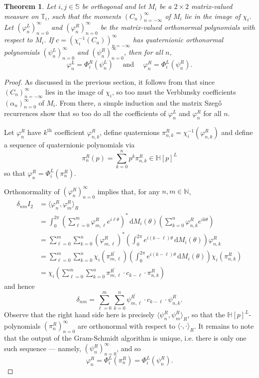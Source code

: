 \documentclass[11pt,reqno]{amsart}
\def\a{\alpha}
\def\x{\chi}
\def\p{\varphi}
\def\q{\psi}
\def\d{\delta}
\def\th{\theta}
\def\P{\Phi}
\def\rmd{\mathrm{d}}
\def\NN{\mathbb{N}}
\def\SS{\mathbb{S}}
\def\TT{\mathbb{T}}
\def\HH{\mathbb{H}}
\newtheorem{theorem}{Theorem}[section]
\theoremstyle{definition}
\numberwithin{equation}{section}
\begin{document}
\begin{theorem}
    Let \(i,j\in\SS\) be orthogonal and let \(M_i\) be a \(2\times2\) matrix-valued measure on \(\TT_i\), such that the moments \((C_n)_{n=-\infty}^{\infty}\) of \(M_i\) lie in the image of \(\x_i\). Let \((\p_n^L)_{n=0}^{\infty}\) and \((\p_n^R)_{n=0}^{\infty}\) be the matrix-valued orthonormal polynomials with respect to \(M_i\). If \(c = (\x_i^{-1}(C_n))_{n=-\infty}^{\infty}\) has quaternionic orthonormal polynomials \((\q_n^L)_{n=0}^{\infty}\) and \((\q_n^R)_{n=0}^{\infty}\), then for all \(n\),
    \[
        \p_n^L = \P_i^R(\q_n^L) \quad \text{ and } \quad \p_n^R = \P_i^L(\q_n^R).
    \]
\end{theorem}
\begin{proof}
    As discussed in the previous section, it follows from  that since \((C_n)_{n=-\infty}^{\infty}\) lies in the image of \(\x_i\), so too must the Verblunsky coefficients \((\a_n)_{n=0}^{\infty}\) of \(M_i\). From there, a simple induction and the matrix Szeg\H{o} recurrences \cite[Theorem 3.3]{DPS08} show that so too do all the coefficients of \(\p_n^L\) and \(\p_n^R\) for all \(n\). 
    
    Let \(\p_n^R\) have \(k^{\mathrm{th}}\) coefficient \(\p_{n,k}^R\), define quaternions \(\pi_{n,k}^R = \x_i^{-1}(\p_{n,k}^R)\) and define a sequence of quaternionic polynomials via
    \[
        \pi_n^R(p) = \sum_{k=0}^n p^k \pi_{n,k}^R \in \HH[p]^L
    \]
    so that \(\p_n^R = \P_i^L(\pi_n^R)\).
    
    Orthonormality of \((\p_n^R)_{n=0}^{\infty}\) implies that, for any \(n,m \in \NN\),
    \begin{align*}
        \d_{nm} I_2 & = \langle \p_n^R, \p_m^R \rangle_R \\
        & = \int_0^{2\pi} \left( \sum_{\ell = 0}^m \p_{m,\ell}^R e^{i\ell\th} \right)^* \, \rmd M_i(\th) \left(\sum_{k=0}^n \p_{n,k}^R e^{ik\th} \right) \\
        & = \sum_{\ell = 0}^m \sum_{k=0}^n (\p_{m,\ell}^R)^* \left( \int_0^{2\pi} e^{i(k-\ell)\th} \, \rmd M_i(\th) \right) \p_{n,k}^R \\
        & = \sum_{\ell = 0}^m \sum_{k=0}^n \x_i(\overline{\pi_{m,\ell}^R}) \left( \int_0^{2\pi} e^{i(k-\ell)\th} \, \rmd M_i(\th) \right) \x_i(\pi_{n,k}^R) \\
        & = \x_i\left( \sum_{\ell=0}^{m} \sum_{k=0}^n \overline{\pi_{m,\ell}^R} \cdot c_{k-\ell} \cdot \pi_{n,k}^R\right)
    \end{align*}
    and hence
    \[
        \d_{nm} = \sum_{\ell=0}^{m} \sum_{k=0}^n \overline{\q_{m,\ell}^R} \cdot c_{k-\ell} \cdot \q_{n,k}^R.
    \]
    Observe that the right hand side here is precisely \(\langle \q_n^R, \q_m^R \rangle_R\), so that the \(\HH[p]^L\)-polynomials \((\pi_n^R)_{n=0}^{\infty}\) are orthonormal with respect to \(\langle \cdot, \cdot \rangle_R\). It remains to note that the output of the Gram-Schmidt algorithm is unique, i.e. there is only one such sequence --- namely, \((\q_n^R)_{n=0}^{\infty}\), and so
    \[
        \p_n^R = \P_i^L(\pi_n^R) = \P_i^L(\q_n^R).
    \]
    

\end{proof}
\end{document}
